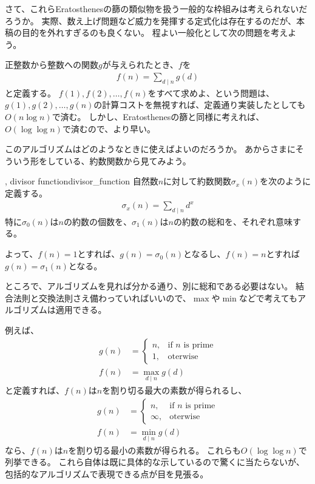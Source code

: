 さて、これらEratosthenesの篩の類似物を扱う一般的な枠組みは考えられないだろうか。
実際、数え上げ問題など威力を発揮する定式化は存在するのだが、本稿の目的を外れすぎるのも良くない。
程よい一般化として次の問題を考えよう。

正整数から整数への関数$g$が与えられたとき、$f$を
\begin{align*}
f(n) = \sum_{d \mid n}g(d)
\end{align*}
と定義する。
$f(1),f(2),\ldots,f(n)$をすべて求めよ、という問題は、$g(1),g(2),\ldots,g(n)$の計算コストを無視すれば、定義通り実装したとしても$O(n\log{n})$で済む。
しかし、Eratosthenesの篩と同様に考えれば、$O(\log{\log{n}})$で済むので、より早い。


このアルゴリズムはどのようなときに使えばよいのだろうか。
あからさまにそういう形をしている、約数関数から見てみよう。

\begin{Defi}{, divisor function}{divisor_function}
自然数$n$に対して約数関数$\sigma_x(n)$を次のように定義する。
\begin{align*}
\sigma_x(n) = \sum_{d \mid n} d^x
\end{align*}
特に$\sigma_0(n)$は$n$の約数の個数を、$\sigma_1(n)$は$n$の約数の総和を、それぞれ意味する。
\end{Defi}

よって、$f(n)=1$とすれば、$g(n)=\sigma_0(n)$となるし、$f(n)=n$とすれば$g(n)=\sigma_1(n)$となる。

ところで、アルゴリズムを見れば分かる通り、別に総和である必要はない。
結合法則と交換法則さえ備わっていればいいので、$\max$や$\min$などで考えてもアルゴリズムは適用できる。

例えば、
\begin{align*}
g(n) &=
\begin{cases}
n, &\mbox{if } n \mbox{ is prime}\\
1, &\mbox{oterwise}
\end{cases}
\\
f(n) &= \max_{d \mid n}g(d)
\end{align*}
と定義すれば、$f(n)$は$n$を割り切る最大の素数が得られるし、
\begin{align*}
g(n) &=
\begin{cases}
n, &\mbox{if } n \mbox{ is prime}\\
\infty, &\mbox{oterwise}
\end{cases}
\\
f(n) &= \min_{d \mid n}g(d)
\end{align*}
なら、$f(n)$は$n$を割り切る最小の素数が得られる。
これらも$O(\log{\log{n}})$で列挙できる。
これら自体は既に具体的な示しているので驚くに当たらないが、包括的なアルゴリズムで表現できる点が目を見張る。

